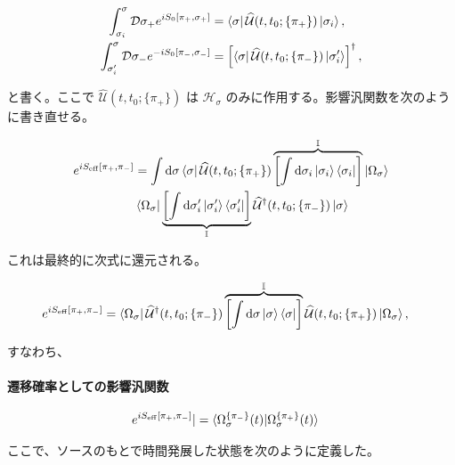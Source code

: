 \documentclass[a4paper,11pt]{ltjsarticle}
\numberwithin{equation}{section}
\newcommand{\dd}{\mathrm{d}}
\newcommand{\ee}{e}
\begin{document}
\begin{align}
     \int_{\sigma_i}^\sigma \mathcal{D}\sigma_+  \ee^{i S_0\left[\pi_+,\sigma_+ \right]} &= \bra{\sigma}   \widehat{\mathcal{U}}(t,t_0;\{\pi_+\})\ket{\sigma_i}, \\ 
     \int_{\sigma_i^\prime}^\sigma \mathcal{D}\sigma_-  \ee^{-i S_0\left[\pi_-,\sigma_- \right]} &= \left[\bra{\sigma}   \widehat{\mathcal{U}}(t,t_0;\{\pi_-\})\ket{\sigma_i^\prime}\right]^\dag,
\end{align}

と書く。ここで $\widehat{\mathcal{U}}(t,t_0;\{\pi_+\})$ は $\mathcal{H}_\sigma$ のみに作用する。影響汎関数を次のように書き直せる。

\begin{align}
    \ee^{i S_{\mathrm{eff}}\left[ \pi_+, \pi_-\right]} &= \int \dd\sigma \bra{\sigma} \widehat{\mathcal{U}}(t,t_0;\{\pi_+\}) \overbrace{\left[\int \dd \sigma_i  \ket{\sigma_i} \bra{\sigma_i} \right]}^{\mathbb{I}}\ket{\Omega_\sigma} \\
    &\bra{\Omega_\sigma} \underbrace{\left[ \int \dd \sigma_i^\prime  \ket{\sigma_i^\prime}  \bra{\sigma_i^\prime} \right]}_{\mathbb{I}}\widehat{\mathcal{U}}^\dag(t,t_0;\{\pi_-\}) \ket{\sigma} \nonumber 
\end{align}

これは最終的に次式に還元される。

\begin{align}
    \ee^{i S_{\mathrm{eff}}\left[ \pi_+, \pi_-\right]} &= \bra{\Omega_\sigma} \widehat{\mathcal{U}}^\dag(t,t_0;\{\pi_-\})
    \overbrace{\left[\int \dd \sigma \ket{\sigma} \bra{\sigma} \right]}^{\mathbb{I}}\widehat{\mathcal{U}}(t,t_0;\{\pi_+\}) \ket{\Omega_\sigma},
\end{align}

すなわち、
\begin{tcolorbox}[enhanced,breakable,skin first=enhanced,skin middle=enhanced,skin last=enhanced]
\paragraph{遷移確率としての影響汎関数}

\begin{align}\label{eq:rate}
    \ee^{i S_{\mathrm{eff}}\left[ \pi_+, \pi_-\right]}|  &= \braket{\Omega^{ \{\pi_- \} }_\sigma (t) | \Omega^{ \{\pi_+ \} }_\sigma (t) } 
\end{align}

\end{tcolorbox}\noindent ここで、ソースのもとで時間発展した状態を次のように定義した。
\end{document}
